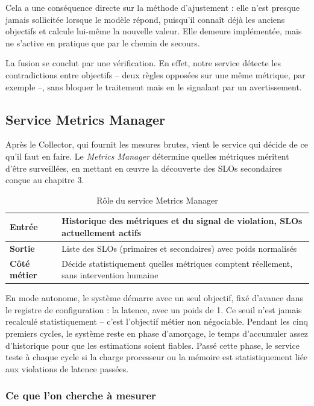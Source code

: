 Cela a une conséquence directe sur la méthode d'ajustement : elle n'est presque jamais sollicitée lorsque le modèle répond, puisqu'il connaît déjà les anciens objectifs et calcule lui-même la nouvelle valeur. Elle demeure implémentée, mais ne s'active en pratique que par le chemin de secours.

La fusion se conclut par une vérification. En effet, notre service détecte les contradictions entre objectifs -- deux règles opposées sur une même métrique, par exemple --, sans bloquer le traitement mais en le signalant par un avertissement. 
\subsection{Service Metrics Manager}

Après le Collector, qui fournit les mesures brutes, vient le service qui décide de ce qu'il faut en faire. Le \emph{Metrics Manager} détermine quelles métriques méritent d'être surveillées, en mettant en œuvre la découverte des SLOs secondaires conçue au chapitre 3.

\begin{table}[H]
    \centering
    \caption{Rôle du service Metrics Manager}
    \label{tab:metrics-manager-role}
    \begin{tabular}{|p{2.8cm}|p{10.5cm}|}
        \hline
        \textbf{Entrée} & Historique des métriques et du signal de violation, SLOs actuellement actifs \\
        \hline
        \textbf{Sortie} & Liste des SLOs (primaires et secondaires) avec poids normalisés \\
        \hline
        \textbf{Côté métier} & Décide statistiquement quelles métriques comptent réellement, sans intervention humaine \\
        \hline
    \end{tabular}
\end{table}

En mode autonome, le système démarre avec un seul objectif, fixé d'avance dans le registre de configuration : la latence, avec un poids de 1. Ce seuil n'est jamais recalculé statistiquement -- c'est l'objectif métier non négociable. Pendant les cinq premiers cycles, le système reste en phase d'amorçage, le temps d'accumuler assez d'historique pour que les estimations soient fiables. Passé cette phase, le service teste à chaque cycle si la charge processeur ou la mémoire est statistiquement liée aux violations de latence passées.

\subsubsection{Ce que l'on cherche à mesurer}

